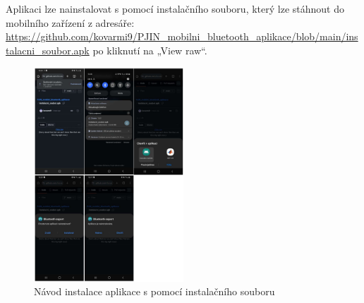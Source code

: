 \hspace{1 cm}
Aplikaci lze nainstalovat s pomocí instalačního souboru, který lze stáhnout do mobilního zařízení z adresáře: \href{https://github.com/kovarmi9/PJIN_mobilni_bluetooth_aplikace/blob/main/instalacni_soubor.apk}{https://github.com/kovarmi9/PJIN\_mobilni\_bluetooth\_aplikace/blob/main/instalacni\_soubor.apk} po kliknutí na „View raw“.

\begin{figure}[H]
    \centering
    \includegraphics[width=0.5\textwidth]{images/navod_instalace.png}
    \caption{Návod instalace aplikace s pomocí instalačního souboru}
\end{figure}
